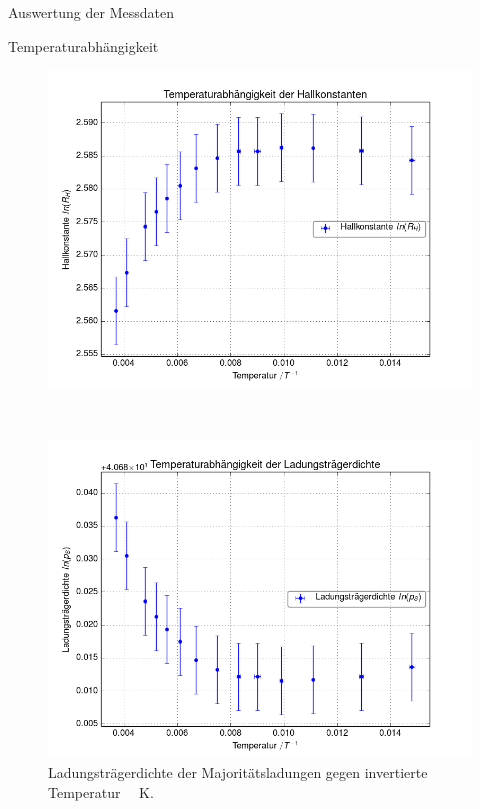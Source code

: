 \documentclass[pdftex, a4paper,11pt, twoside, ngerman]{report}
\begin{document}
\begin{chapter}{Auswertung der Messdaten}
\begin{section}{Temperaturabhängigkeit}
      \newpage
      \begin{figure}[ht!]
        \centering
        \begin{minipage}{.92\textwidth}
          \centering
          \includegraphics[width=\textwidth]{Figures/Temp_Hallkonstante.png}
          \caption{Hallkonstante gegen invertierte Temperatur
              \SI{}{\per\kelvin}.}
          \label{fig:TempHallkonstante}
        \end{minipage}\\
        \begin{minipage}{.92\textwidth}
          \centering
          \includegraphics[width=\textwidth]{Figures/Temp_Ladungsdichte.png}
          \caption{Ladungsträgerdichte der Majoritätsladungen gegen invertierte
              Temperatur \SI{}{\per\kelvin}.}
          \label{fig:TempLadungsdichte}
        \end{minipage}
      \end{figure}
      

\end{section}
\end{chapter}
\end{document}
